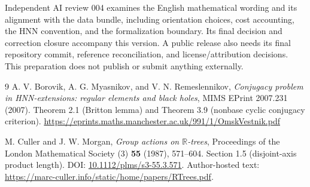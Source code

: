 \documentclass[11pt,a4paper]{article}
\theoremstyle{definition}\newtheorem{definition}[theorem]{Definition}
\theoremstyle{remark}\newtheorem{remark}[theorem]{Remark}
\begin{document}
Independent AI review 004 examines the English mathematical wording and its alignment with the data bundle, including orientation choices, cost accounting, the HNN convention, and the formalization boundary. Its final decision and correction closure accompany this version. A public release also needs its final repository commit, reference reconciliation, and license/attribution decisions. This preparation does not publish or submit anything externally.

\begin{thebibliography}{9}\small
{}
A. V. Borovik, A. G. Myasnikov, and V. N. Remeslennikov,
\emph{Conjugacy problem in HNN-extensions: regular elements and black holes},
MIMS EPrint 2007.231 (2007).
Theorem 2.1 (Britton lemma) and Theorem 3.9 (nonbase cyclic conjugacy criterion).
\url{https://eprints.maths.manchester.ac.uk/991/1/OmskVestnik.pdf}

M. Culler and J. W. Morgan,
\emph{Group actions on $\mathbb R$-trees},
Proceedings of the London Mathematical Society (3) \textbf{55} (1987), 571--604.
Section 1.5 (disjoint-axis product length).
DOI: \href{https://doi.org/10.1112/plms/s3-55.3.571}{10.1112/plms/s3-55.3.571}.
Author-hosted text: \url{https://marc-culler.info/static/home/papers/RTrees.pdf}.
\end{thebibliography}
\end{document}
